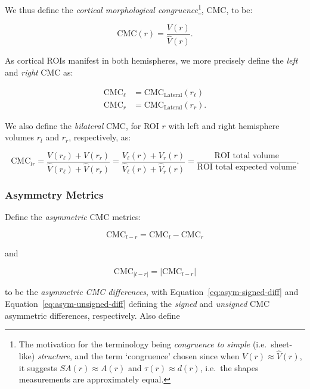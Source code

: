 \documentclass{article}
\begin{document}
We thus define the \emph{cortical morphological congruence}\footnote{The
motivation for the terminology being \emph{congruence to simple} (i.e.\
sheet-like) \emph{structure}, and the term `congruence' chosen since when
\(V(r) \approx \hat{V}(r)\), it suggests \(SA(r) \approx A(r)\) and \(\tau(r)
\approx d(r)\), i.e.\ the shapes measurements are approximately equal.}, CMC,
to be:

\begin{equation}
\text{CMC}(r) = \frac{V(r)}{\hat{V}(r)}.
\end{equation}

As cortical ROIs manifest in both hemispheres, we more precisely define the \emph{left}
and \emph{right} CMC as:

\begin{align}
\label{eq:cmc-laterals}
\text{CMC}_{\ell} &= \text{CMC}_{\text{Lateral}}(r_{\ell}) \\
\text{CMC}_r &= \text{CMC}_{\text{Lateral}}(r_r).
\end{align}

We also define the \emph{bilateral} CMC, for ROI \(r\) with left and right
hemisphere volumes \(r_l\) and \(r_r\), respectively, as:

\begin{equation} \label{eq:cmc-bilateral}
\text{CMC}_{lr}
=\frac{V(r_{\ell}) + V(r_r)}{\hat{V}(r_{\ell}) + \hat{V}(r_r)}
=\frac{V_{\ell}(r) + V_r(r)}{\hat{V}_{\ell}(r) + \hat{V}_r(r)}
=\frac{\text{ROI total volume}}{\text{ROI total expected volume}}.
\end{equation}



\subsubsection{Asymmetry Metrics}

Define the \emph{asymmetric} CMC metrics:

\begin{equation} \label{eq:asym-signed-diff}
\text{CMC}_{l - r} = \text{CMC}_{l} - \text{CMC}_{r}
\end{equation}

and

\begin{equation} \label{eq:asym-unsigned-diff}
\text{CMC}_{|l - r|} = \lvert\text{CMC}_{l - r} \rvert
\end{equation}

to be the \emph{asymmetric CMC differences}, with
Equation~\ref{eq:asym-signed-diff} and Equation~\ref{eq:asym-unsigned-diff}
defining the \emph{signed} and \emph{unsigned} CMC asymmetric differences,
respectively. Also define
\end{document}
